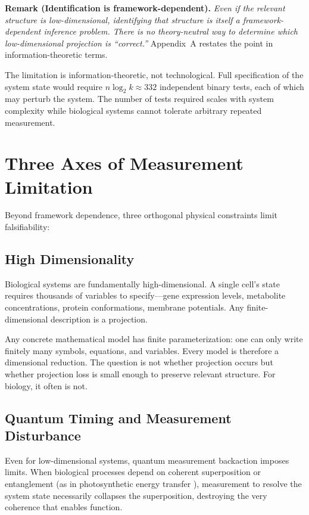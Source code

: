 \documentclass[12pt]{article}
\begin{document}
\medskip
\noindent\textbf{Remark (Identification is framework-dependent).} \emph{Even if the relevant structure is low-dimensional, identifying that structure is itself a framework-dependent inference problem. There is no theory-neutral way to determine which low-dimensional projection is ``correct.''} Appendix~A restates the point in information-theoretic terms.
\medskip

The limitation is information-theoretic, not technological. Full specification of the system state would require $n \log_2 k \approx 332$ independent binary tests, each of which may perturb the system. The number of tests required scales with system complexity while biological systems cannot tolerate arbitrary repeated measurement.

\section{Three Axes of Measurement Limitation}
\label{sec:three_axes}

Beyond framework dependence, three orthogonal physical constraints limit falsifiability:

\subsection{High Dimensionality}

Biological systems are fundamentally high-dimensional. A single cell's state requires thousands of variables to specify---gene expression levels, metabolite concentrations, protein conformations, membrane potentials. Any finite-dimensional description is a projection.

Any concrete mathematical model has finite parameterization: one can only write finitely many symbols, equations, and variables. Every model is therefore a dimensional reduction. The question is not whether projection occurs but whether projection loss is small enough to preserve relevant structure. For biology, it often is not.

\subsection{Quantum Timing and Measurement Disturbance}

Even for low-dimensional systems, quantum measurement backaction imposes limits. When biological processes depend on coherent superposition or entanglement (as in photosynthetic energy transfer \cite{engel2007}), measurement to resolve the system state necessarily collapses the superposition, destroying the very coherence that enables function.
\end{document}
